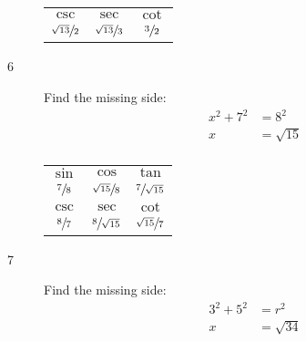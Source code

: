 \documentclass{exam}
\begin{document}
\begin{description}
\begin{tabular}[H]{ccc}
          \midrule

          $\csc$                 & $\sec$                 & $\cot$ \\
          $\sfrac{\sqrt{13}}{2}$ & $\sfrac{\sqrt{13}}{3}$ & $\sfrac{3}{2}$ \\

          \bottomrule
        \end{tabular}

      \pagebreak

      \item[6] 
        Find the missing side:
        \begin{align*}
          x^2 + 7^2 & = 8^2 \\
          x         & = \sqrt{15} \\
        \end{align*}

        \begin{tabular}[H]{ccc}
          \toprule

          $\sin$         & $\cos$                 & $\tan$                 \\
          $\sfrac{7}{8}$ & $\sfrac{\sqrt{15}}{8}$ & $\sfrac{7}{\sqrt{15}}$ \\

          \midrule

          $\csc$         & $\sec$                 & $\cot$ \\
          $\sfrac{8}{7}$ & $\sfrac{8}{\sqrt{15}}$ & $\sfrac{\sqrt{15}}{7}$ \\

          \bottomrule
        \end{tabular}

      \item[7]
        Find the missing side:
        \begin{align*}
          3^2 + 5^2 & = r^2 \\
          x         & = \sqrt{34} \\
        \end{align*}

\end{description}
\end{document}
